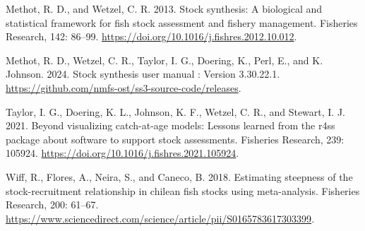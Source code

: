 \documentclass[
]{article}
\newlength{\cslhangindent}
\newlength{\cslentryspacingunit} %
\newenvironment{CSLReferences}[2] %
 {%
  \setlength{\parindent}{0pt}
  \ifodd #1
  \let\oldpar\par
  \def\par{\hangindent=\cslhangindent\oldpar}
  \fi
  \setlength{\parskip}{#2\cslentryspacingunit}
 }%
 {}
\begin{document}
\begin{CSLReferences}{1}{0}
\leavevmode{}%
Methot, R. D., and Wetzel, C. R. 2013. Stock synthesis: A biological and
statistical framework for fish stock assessment and fishery management.
Fisheries Research, 142: 86--99.
\url{https://doi.org/10.1016/j.fishres.2012.10.012}.

\leavevmode{}%
Methot, R. D., Wetzel, C. R., Taylor, I. G., Doering, K., Perl, E., and
K. Johnson. 2024. Stock synthesis user manual : Version 3.30.22.1.
\url{https://github.com/nmfs-ost/ss3-source-code/releases}.

\leavevmode{}%
Taylor, I. G., Doering, K. L., Johnson, K. F., Wetzel, C. R., and
Stewart, I. J. 2021. Beyond visualizing catch-at-age models: Lessons
learned from the r4ss package about software to support stock
assessments. Fisheries Research, 239: 105924.
\url{https://doi.org/10.1016/j.fishres.2021.105924}.

\leavevmode{}%
Wiff, R., Flores, A., Neira, S., and Caneco, B. 2018. Estimating
steepness of the stock-recruitment relationship in chilean fish stocks
using meta-analysis. Fisheries Research, 200: 61--67.
\url{https://www.sciencedirect.com/science/article/pii/S0165783617303399}.

\end{CSLReferences}
\end{document}
